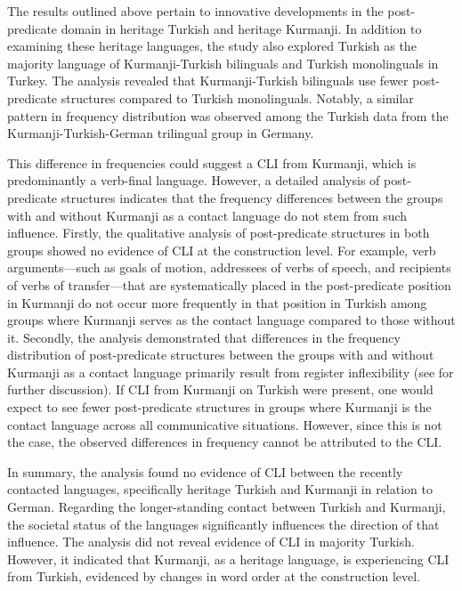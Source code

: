 The results outlined above pertain to innovative developments in the post-predicate domain in heritage Turkish and heritage Kurmanji. In addition to examining these heritage languages, the study also explored Turkish as the majority language of Kurmanji-Turkish bilinguals and Turkish monolinguals in Turkey. The analysis revealed that Kurmanji-Turkish bilinguals use fewer post-predicate structures compared to Turkish monolinguals. Notably, a similar pattern in frequency distribution was observed among the Turkish data from the Kurmanji-Turkish-German trilingual group in Germany.

This difference in frequencies could suggest a CLI from Kurmanji, which is predominantly a verb-final language. However, a detailed analysis of post-predicate structures indicates that the frequency differences between the groups with and without Kurmanji as a contact language do not stem from such influence. Firstly, the qualitative analysis of post-predicate structures in both groups showed no evidence of CLI at the construction level. For example, verb arguments—such as goals of motion, addressees of verbs of speech, and recipients of verbs of transfer—that are systematically placed in the post-predicate position in Kurmanji do not occur more frequently in that position in Turkish among groups where Kurmanji serves as the contact language compared to those without it. Secondly, the analysis demonstrated that differences in the frequency distribution of post-predicate structures between the groups with and without Kurmanji as a contact language primarily result from register inflexibility (see  for further discussion). If CLI from Kurmanji on Turkish were present, one would expect to see fewer post-predicate structures in groups where Kurmanji is the contact language across all communicative situations. However, since this is not the case, the observed differences in frequency cannot be attributed to the CLI.

In summary, the analysis found no evidence of CLI between the recently contacted languages, specifically heritage Turkish and Kurmanji in relation to German. Regarding the longer-standing contact between Turkish and Kurmanji, the societal status of the languages significantly influences the direction of that influence. The analysis did not reveal evidence of CLI in majority Turkish. However, it indicated that Kurmanji, as a heritage language, is experiencing CLI from Turkish, evidenced by changes in word order at the construction level.

